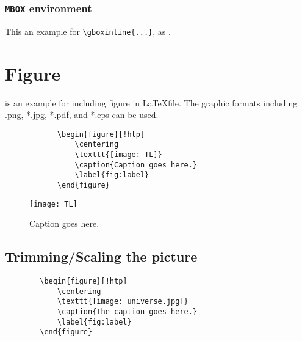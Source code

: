 \subsubsection{\texttt{MBOX} environment}

This an example for \verb|\gboxinline{...}|, as .




\np
{}
\section{Figure}
\noindent {}  is an example for including figure in \LaTeX file. The graphic formats including .png, *.jpg, *.pdf, and *.eps can be used.

\begin{SBN}
	{\color{blue}
		\begin{verbatim}
			\begin{figure}[!htp] 
				\centering
				\texttt{[image: TL]}
				\caption{Caption goes here.} 
				\label{fig:label}
			\end{figure}    
		\end{verbatim}
	}
\end{SBN}

\begin{figure}[!htp] 
	\centering
	\texttt{[image: TL]}
	\caption{Caption goes here.}
	\label{fig:0}
\end{figure} 


\subsection{Trimming/Scaling the picture}

\begin{SBN}
{\color{blue}
	\begin{verbatim}
		\begin{figure}[!htp] 
			\centering
			\texttt{[image: universe.jpg]}
			\caption{The caption goes here.} 
			\label{fig:label}
		\end{figure}   
	\end{verbatim} 
}
\end{SBN}

